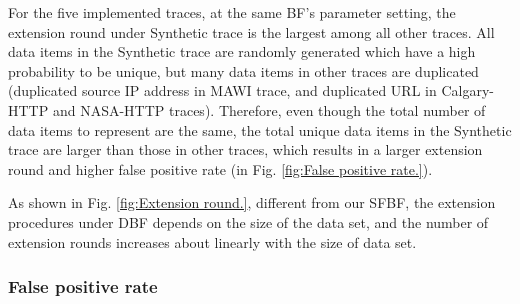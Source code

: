 \documentclass[10pt,journal,compsoc]{IEEEtran}
\begin{document}
For the five implemented traces, at the same BF's parameter setting, the extension round under Synthetic trace is the largest among all other traces. All data items in the Synthetic trace are randomly generated which have a high probability to be unique, but many data items in other traces are duplicated (duplicated source IP address in  MAWI trace, and duplicated URL in Calgary-HTTP and NASA-HTTP traces). Therefore, even though the total number of data items to represent are the same, the total unique data items in the Synthetic trace are larger than those in other traces, which results in a larger extension round and higher false positive rate (in Fig. \ref{fig:False positive rate.}).

As shown in Fig. \ref{fig:Extension round.}, different from our SFBF, the extension procedures under DBF depends on the size of the data set, and the number of extension rounds increases about linearly with the size of data set.





\subsubsection{False positive rate}
\end{document}
